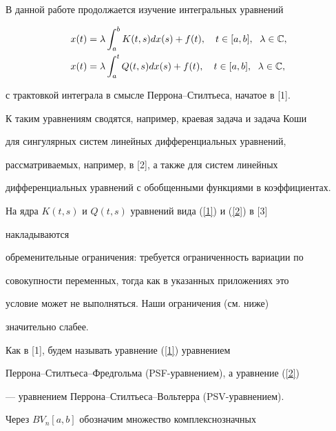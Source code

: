 \label{begin}





В данной работе продолжается изучение интегральных уравнений


\begin{align}


\label{1} 


x(t)&=\lambda\integral{a}{b}K(t,s)dx(s)+f(t),\quad t\in[a,b],


\ \;\lambda\in \C,\\


\label{2}


x(t)&=\lambda\integral{a}{t}Q(t,s)dx(s)+f(t),\quad t\in[a,b],


\ \;\lambda\in \C,


\end{align}


с трактовкой интеграла в смысле Перрона--Стилтьеса, начатое в [1].


К таким уравнениям сводятся, например, краевая задача и задача Коши


для сингулярных систем линейных дифференциальных уравнений,


рассматриваемых, например, в [2], а также для систем линейных


дифференциальных уравнений с обобщенными функциями в коэффициентах.








На ядра $K(t,s)$ и $Q(t,s)$ уравнений вида (\ref{1}) и (\ref{2}) в [3]


накладываются 


обременительные ограничения: требуется ограниченность вариации по


совокупности переменных, тогда как в указанных приложениях это


условие может не выполняться. Наши ограничения (см. ниже)


значительно слабее.





Как в [1], будем называть уравнение (\ref{1}) уравнением


Перрона--Стилтьеса--Фредгольма (PSF-уравнением), а уравнение (\ref{2})


--- уравнением Перрона--Стилтьеса--Вольтерра (PSV-уравнением).





Через $BV_n[a,b]$ обозначим множество комплекснозначных


